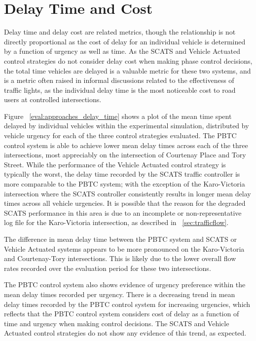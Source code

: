 \section {Delay Time and Cost}
\label{sec:incurred_delay_cost}

Delay time and delay cost are related metrics, though the relationship is not directly proportional as the cost of delay for an individual vehicle is determined by a function of urgency as well as time. As the SCATS and Vehicle Actuated control strategies do not consider delay cost when making phase control decisions, the total time vehicles are delayed is a valuable metric for these two systems, and is a metric often raised in informal discussions related to the effectiveness of traffic lights, as the individual delay time is the most noticeable cost to road users at controlled intersections.

Figure ~\ref{eval:approaches_delay_time} shows a plot of the mean time spent delayed by individual vehicles within the experimental simulation, distributed by vehicle urgency for each of the three control strategies evaluated. The PBTC control system is able to achieve lower mean delay times across each of the three intersections, most appreciably on the intersection of Courtenay Place and Tory Street. While the performance of the Vehicle Actuated control strategy is typically the worst, the delay time recorded by the SCATS traffic controller is more comparable to the PBTC system; with the exception of the Karo-Victoria intersection where the SCATS controller consistently results in longer mean delay times across all vehicle urgencies. It is possible that the reason for the degraded SCATS performance in this area is due to an incomplete or non-representative log file for the Karo-Victoria intersection, as described in ~\ref{sec:trafficflow}. 

The difference in mean delay time between the PBTC system and SCATS or Vehicle Actuated systems appears to be more pronounced on the Karo-Victoria and Courtenay-Tory intersections. This is likely due to the lower overall flow rates recorded over the evaluation period for these two intersections. %

The PBTC control system also shows evidence of urgency preference within the mean delay times recorded per urgency. There is a decreasing trend in mean delay times recorded by the PBTC control system for increasing urgencies, which reflects that the PBTC control system considers cost of delay as a function of time and urgency when making control decisions. The SCATS and Vehicle Actuated control strategies do not show any evidence of this trend, as expected.


